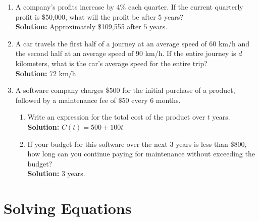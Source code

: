 \documentclass{article}
\begin{document}
\begin{enumerate}[leftmargin = 0.5cm, label = \arabic*., rightmargin = 0.2cm]
    \item A company's profits increase by $4\%$ each quarter. If the current quarterly profit is \$50,000, what will the profit be after 5 years? \\
    \textbf{Solution:} Approximately \$109,555 after $5$ years.

    \item A car travels the first half of a journey at an average speed of $60$ km/h and the second half at an average speed of $90$ km/h. If the entire journey is $d$ kilometers, what is the car’s average speed for the entire trip? \\
    \textbf{Solution:} \( 72 \text{ km/h} \)

    \item A software company charges \$500 for the initial purchase of a product, followed by a maintenance fee of \$50 every $6$ months.
    \begin{enumerate}[leftmargin = 0.5cm, label = (\alph*), rightmargin = 0.2cm]
        \item Write an expression for the total cost of the product over $t$ years. \\
        \textbf{Solution:} \( C(t) = 500 + 100t \)
        
        \item If your budget for this software over the next $3$ years is less than \$800, how long can you continue paying for maintenance without exceeding the budget? \\
        \textbf{Solution:} $3$ years.
    \end{enumerate}

\end{enumerate}

\section{Solving Equations}
\end{document}
